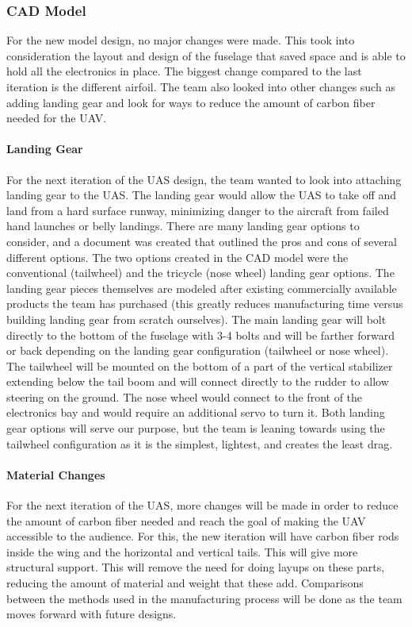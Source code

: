\documentclass{article}
\begin{document}
\subsubsection{CAD Model}
For the new model design, no major changes were made. This took into consideration the layout and design of the fuselage that saved space and is able to hold all the electronics in place. The biggest change compared to the last iteration is the different airfoil. The team also looked into other changes such as adding landing gear and look for ways to reduce the amount of carbon fiber needed for the UAV.

\paragraph{Landing Gear}
For the next iteration of the UAS design, the team wanted to look into attaching landing gear to the UAS. The landing gear would allow the UAS to take off and land from a hard surface runway, minimizing danger to the aircraft from failed hand launches or belly landings. There are many landing gear options to consider, and a document was created that outlined the pros and cons of several different options. The two options created in the CAD model were the conventional (tailwheel) and the tricycle (nose wheel) landing gear options. The landing gear pieces themselves are modeled after existing commercially available products the team has purchased (this greatly reduces manufacturing time versus building landing gear from scratch ourselves). The main landing gear will bolt directly to the bottom of the fuselage with 3-4 bolts and will be farther forward or back depending on the landing gear configuration (tailwheel or nose wheel). The tailwheel will be mounted on the bottom of a part of the vertical stabilizer extending below the tail boom and will connect directly to the rudder to allow steering on the ground. The nose wheel would connect to the front of the electronics bay and would require an additional servo to turn it. Both landing gear options will serve our purpose, but the team is leaning towards using the tailwheel configuration as it is the simplest, lightest, and creates the least drag.

\paragraph{Material Changes}
For the next iteration of the UAS, more changes will be made in order to reduce the amount of carbon fiber needed and reach the goal of making the UAV accessible to the audience. For this, the new iteration will have carbon fiber rods inside the wing and the horizontal and vertical tails. This will give more structural support. This will remove the need for doing layups on these parts, reducing the amount of material and weight that these add. Comparisons between the methods used in the manufacturing process will be done as the team moves forward with future designs.
\end{document}

